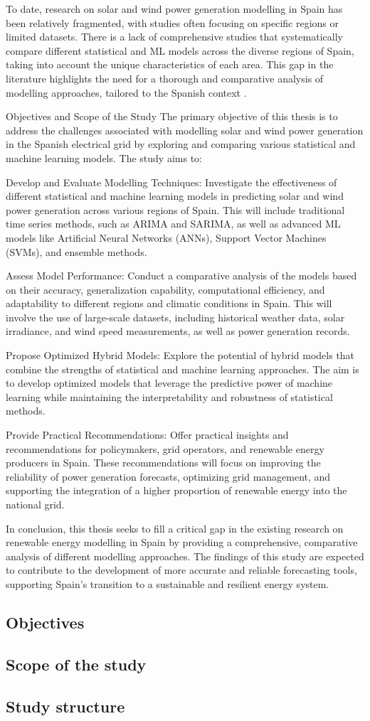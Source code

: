 To date, research on solar and wind power generation modelling in Spain has been relatively fragmented, with studies often focusing on specific regions or limited datasets. There is a lack of comprehensive studies that systematically compare different statistical and ML models across the diverse regions of Spain, taking into account the unique characteristics of each area. This gap in the literature highlights the need for a thorough and comparative analysis of modelling approaches, tailored to the Spanish context .

Objectives and Scope of the Study
The primary objective of this thesis is to address the challenges associated with modelling solar and wind power generation in the Spanish electrical grid by exploring and comparing various statistical and machine learning models. The study aims to:

Develop and Evaluate Modelling Techniques: Investigate the effectiveness of different statistical and machine learning models in predicting solar and wind power generation across various regions of Spain. This will include traditional time series methods, such as ARIMA and SARIMA, as well as advanced ML models like Artificial Neural Networks (ANNs), Support Vector Machines (SVMs), and ensemble methods.

Assess Model Performance: Conduct a comparative analysis of the models based on their accuracy, generalization capability, computational efficiency, and adaptability to different regions and climatic conditions in Spain. This will involve the use of large-scale datasets, including historical weather data, solar irradiance, and wind speed measurements, as well as power generation records.

Propose Optimized Hybrid Models: Explore the potential of hybrid models that combine the strengths of statistical and machine learning approaches. The aim is to develop optimized models that leverage the predictive power of machine learning while maintaining the interpretability and robustness of statistical methods.

Provide Practical Recommendations: Offer practical insights and recommendations for policymakers, grid operators, and renewable energy producers in Spain. These recommendations will focus on improving the reliability of power generation forecasts, optimizing grid management, and supporting the integration of a higher proportion of renewable energy into the national grid.

In conclusion, this thesis seeks to fill a critical gap in the existing research on renewable energy modelling in Spain by providing a comprehensive, comparative analysis of different modelling approaches. The findings of this study are expected to contribute to the development of more accurate and reliable forecasting tools, supporting Spain’s transition to a sustainable and resilient energy system.

\subsection{Objectives}
\subsection{Scope of the study}
\subsection{Study structure}
